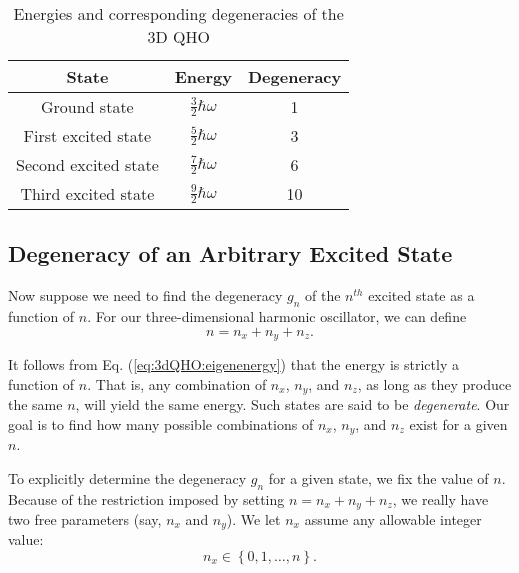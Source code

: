\documentclass{article}
\numberwithin{equation}{section}
\begin{document}
\begin{table}[H]
\centering
{}
\caption{Energies and corresponding degeneracies of the 3D QHO}
\begin{tabular}{@{}ccc@{}}
\toprule
State & Energy & Degeneracy \\ \midrule
\multicolumn{1}{c|}{Ground state} & \multicolumn{1}{c|}{$\displaystyle \frac{3}{2}\hbar\omega$} & 1 \\[1em]
\multicolumn{1}{c|}{First excited state} & \multicolumn{1}{c|}{$\displaystyle \frac{5}{2}\hbar\omega$} & 3 \\[1em]
\multicolumn{1}{c|}{Second excited state} & \multicolumn{1}{c|}{$\displaystyle \frac{7}{2}\hbar\omega$} & 6 \\[1em]
\multicolumn{1}{c|}{Third excited state} & \multicolumn{1}{c|}{$\displaystyle \frac{9}{2}\hbar\omega$} & 10 \\ \bottomrule
\end{tabular}
\end{table}

\subsection{Degeneracy of an Arbitrary Excited State}

Now suppose we need to find the degeneracy $g_n$ of the $n^{th}$ excited state as a function of $n$. For our three-dimensional harmonic oscillator, we can define
\begin{equation*}
    n = n_x + n_y + n_z.
\end{equation*}

It follows from Eq. (\ref{eq:3dQHO:eigenenergy}) that the energy is strictly a function of $n$. That is, any combination of $n_x$, $n_y$, and $n_z$, as long as they produce the same $n$, will yield the same energy. Such states are said to be \emph{degenerate}. Our goal is to find how many possible combinations of $n_x$, $n_y$, and $n_z$ exist for a given $n$.

To explicitly determine the degeneracy $g_n$ for a given state, we fix the value of $n$. Because of the restriction imposed by setting $n = n_x + n_y + n_z$, we really have two free parameters (say, $n_x$ and $n_y$). We let $n_x$ assume any allowable integer value:
\begin{equation*}
    n_x \in \left\{ 0, 1, \dots, n \right\}.
\end{equation*}
\end{document}
